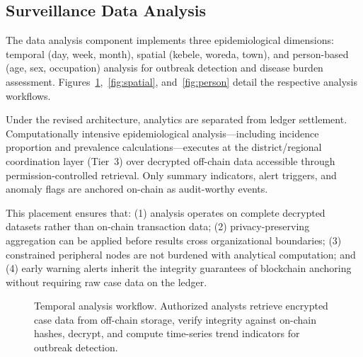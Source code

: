 \subsection{Surveillance Data Analysis}\label{subsec:analysis}

The data analysis component implements three epidemiological dimensions: temporal (day, week, month), spatial (kebele, woreda, town), and person-based (age, sex, occupation) analysis for outbreak detection and disease burden assessment. Figures~\ref{fig:temporal},~\ref{fig:spatial}, and~\ref{fig:person} detail the respective analysis workflows.

Under the revised architecture, analytics are separated from ledger settlement. Computationally intensive epidemiological analysis---including incidence proportion and prevalence calculations---executes at the district/regional coordination layer (Tier~3) over decrypted off-chain data accessible through permission-controlled retrieval. Only summary indicators, alert triggers, and anomaly flags are anchored on-chain as audit-worthy events.

This placement ensures that: (1) analysis operates on complete decrypted datasets rather than on-chain transaction data; (2) privacy-preserving aggregation can be applied before results cross organizational boundaries; (3) constrained peripheral nodes are not burdened with analytical computation; and (4) early warning alerts inherit the integrity guarantees of blockchain anchoring without requiring raw case data on the ledger.


\begin{figure}[!ht]
\centering
{}
\caption{Temporal analysis workflow. Authorized analysts retrieve encrypted case data from off-chain storage, verify integrity against on-chain hashes, decrypt, and compute time-series trend indicators for outbreak detection.}\label{fig:temporal}
\end{figure}

%
%
%


